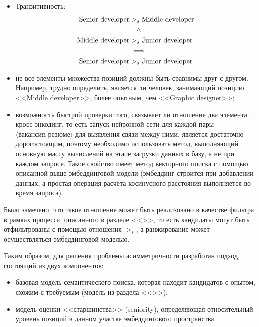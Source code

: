 \documentclass[14pt]{mmcs_article}
\begin{document}
\begin{itemize}
  \item Транзитивность: \\
        \begin{equation*}
          \centering
          \allowdisplaybreaks[1]
          \begin{split}
            \text{Senior developer} & >_{s} \text{Middle developer} \\
                                    & ~~~\land                      \\
            \text{Middle developer} & >_{s} \text{Junior developer} \\
                                    & \implies                      \\
            \text{Senior developer} & >_{s} \text{Junior developer}
          \end{split}
        \end{equation*}
  \item не все элементы множества позиций должны быть сравнимы друг с другом. Например, трудно определить, является ли человек, занимающий позицию <<Middle developer>>, более опытным, чем <<Graphic designer>>;
  \item возможность быстрой проверки того, связывает ли отношение два элемента. кросс-энкодинг, то есть запуск нейронной сети для каждой пары $\langle \text{вакансия}, \text{резюме} \rangle$ для выявления связи между ними, является достаточно дорогостоящим, поэтому необходимо использовать метод, выполняющий основную массу вычислений на этапе загрузки данных в базу, а не при каждом запросе. Такое свойство имеет метод векторного поиска с помощью описанной выше эмбеддинговой модели (эмбеддинг строится при добавлении данных, а простая операция расчёта косинусного расстояния выполняется во время запроса).
\end{itemize}

Было замечено, что такое отношение может быть реализовано в качестве фильтра в рамках процесса, описанного в разделе <<>>, то есть кандидаты могут быть отфильтрованы с помощью отношения $>_{s}$, а ранжирование может осуществляться эмбеддинговой моделью.

  Таким образом, для решения проблемы асимметричности разработан подход, состоящий из двух компонентов:

  \begin{itemize}
    \item базовая модель семантического поиска, которая находит кандидатов с опытом, схожим с требуемым (модель из раздела <<>>);
    \item модель оценки <<старшинства>> (seniority), определяющая относительный уровень позиций в данном участке эмбеддингового пространства.
  \end{itemize}
\end{document}
